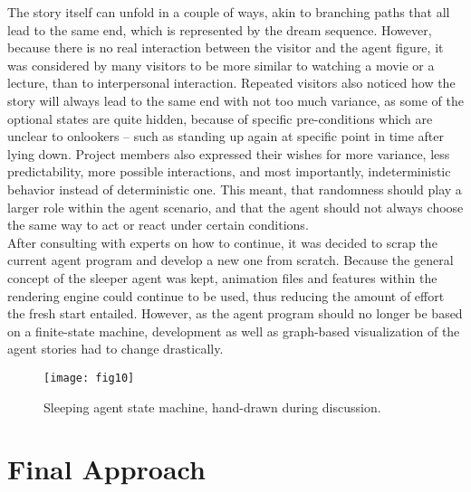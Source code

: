\documentclass[draft,final]{vutinfth} %
\begin{document}
The story itself can unfold in a couple of ways, akin to branching paths that all lead to the same end, which is represented by the dream sequence. 
However, because there is no real interaction between the \gls{visitor} and the \gls{agent figure}, it was considered by many \glspl{visitor} to be more similar to watching a movie or a lecture, than to interpersonal interaction. 
Repeated \glspl{visitor} also noticed how the story will always lead to the same end with not too much variance, as some of the optional states are quite hidden, because of specific pre-conditions which are unclear to onlookers – such as standing up again at specific point in time after lying down. 
Project members also expressed their wishes for more variance, less predictability, more possible interactions, and most importantly, indeterministic behavior instead of deterministic one.
This meant, that randomness should play a larger role within the agent scenario, and that the agent should not always choose the same way to act or react under certain conditions. \\
After consulting with experts on how to continue, it was decided to scrap the current agent program and develop a new one from scratch. 
Because the general concept of the sleeper agent was kept, animation files and features within the rendering engine could continue to be used, thus reducing the amount of effort the fresh start entailed. 
However, as the agent program should no longer be based on a finite-state machine, development as well as graph-based visualization of the agent stories had to change drastically.
\begin{figure}[h]
	\centering
	\texttt{[image: fig10]}
	\caption{Sleeping agent state machine, hand-drawn during discussion.}
	\label{fig:fig10_sleeperState}
\end{figure}

\section{Final Approach}
\label{chap:finalapproach}
\end{document}
